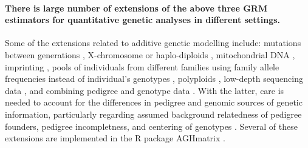 \paragraph*{There is large number of extensions of the above three
GRM estimators for quantitative genetic analyses in different settings.}
%
Some of the extensions related to  additive genetic modelling include:
%
mutations between generations \citep{casellas2013accounting},
%
X-chromosome or haplo-diploids \citep{druet2020theoretical},
%
mitochondrial DNA \citep{mafrafortuna2023accounting},
%
%
imprinting \citep{nishio2015genomic},
%
%
pools of individuals from different families using family allele
frequencies instead of individual's genotypes
\citep{johnston2013fish, ashraf2014association, ashraf2016estimating},
%
polyploids \citep{slater2016improving, bilton2024construction},
%
low-depth sequencing data \citep{dodds2015construction}, and
%
combining pedigree and genotype data 
\citep{legarra2009a, christensen2010genomic, legarra2014single}.
%
With the latter, care is needed to account for the differences in pedigree
and genomic sources of genetic information, particularly regarding assumed
background relatedness of pedigree founders,
pedigree incompletness, and
centering of genotypes
\citep{legarra2015ancestral, legarra2016comparing, masuda2022unknown}.
%
Several of these extensions are implemented in the R package AGHmatrix
\citep{amadeu2023aghmatrix}.

%
%


